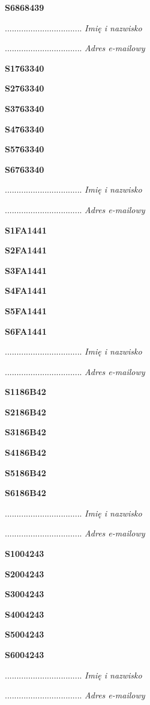 \Large \textbf{S6868439}

.................................
\textit{Imię i nazwisko}

.................................
\textit{Adres e-mailowy}

\Large \textbf{S1763340}

\Large \textbf{S2763340}

\Large \textbf{S3763340}

\Large \textbf{S4763340}

\Large \textbf{S5763340}

\Large \textbf{S6763340}

.................................
\textit{Imię i nazwisko}

.................................
\textit{Adres e-mailowy}

\Large \textbf{S1FA1441}

\Large \textbf{S2FA1441}

\Large \textbf{S3FA1441}

\Large \textbf{S4FA1441}

\Large \textbf{S5FA1441}

\Large \textbf{S6FA1441}

.................................
\textit{Imię i nazwisko}

.................................
\textit{Adres e-mailowy}

\Large \textbf{S1186B42}

\Large \textbf{S2186B42}

\Large \textbf{S3186B42}

\Large \textbf{S4186B42}

\Large \textbf{S5186B42}

\Large \textbf{S6186B42}

.................................
\textit{Imię i nazwisko}

.................................
\textit{Adres e-mailowy}

\Large \textbf{S1004243}

\Large \textbf{S2004243}

\Large \textbf{S3004243}

\Large \textbf{S4004243}

\Large \textbf{S5004243}

\Large \textbf{S6004243}

.................................
\textit{Imię i nazwisko}

.................................
\textit{Adres e-mailowy}

